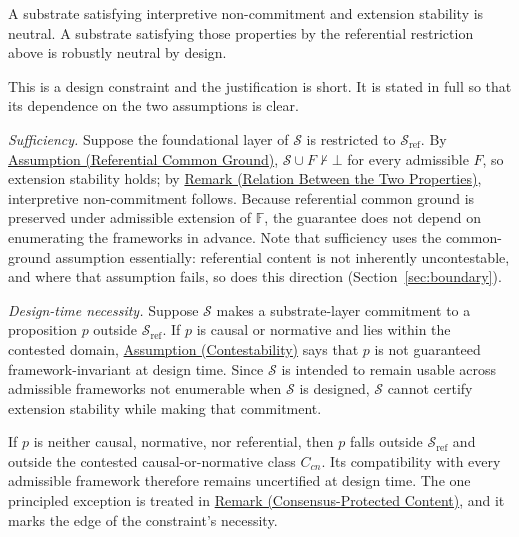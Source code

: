 \documentclass[11pt]{article}
\theoremstyle{plain}
\theoremstyle{definition}
\theoremstyle{remark}
\newcommand{\AssumpRef}[2]{\hyperref[#1]{Assumption (#2)}}
\newcommand{\RemRef}[2]{\hyperref[#1]{Remark (#2)}}
\newcommand{\SecRef}[1]{Section~\ref{#1}}
\newcommand{\Substrate}{\mathcal{S}}
\newcommand{\SubstrateRef}{\mathcal{S}_{\mathrm{ref}}}
\newcommand{\Frameworks}{\mathbb{F}}
\newcommand{\Framework}{F}
\newcommand{\notentails}{\nvdash}
\begin{document}
A substrate satisfying interpretive non-commitment and extension stability is neutral.
A substrate satisfying those properties
by the referential restriction above is robustly neutral by design.

This is a design constraint and the justification is short.
It is stated in full so that its dependence on the
two assumptions is clear.

\emph{Sufficiency.} Suppose the foundational layer of $\Substrate$ is
restricted to $\SubstrateRef$. By
\AssumpRef{se100.def.ReferentialCommonGround}{Referential Common Ground},
$\Substrate \cup \Framework \notentails \bot$ for every admissible $\Framework$,
so extension stability holds; by
\RemRef{se100.remark.PropertyRelation}{Relation Between the Two Properties},
interpretive non-commitment follows.
Because referential common ground is
preserved under admissible extension of $\Frameworks$,
the guarantee does not
depend on enumerating the frameworks in advance.
Note that sufficiency uses the
common-ground assumption essentially:
referential content is not inherently
uncontestable, and where that assumption fails,
so does this direction
(\SecRef{sec:boundary}).

\emph{Design-time necessity.} Suppose $\Substrate$ makes a
substrate-layer commitment to a proposition $p$ outside $\SubstrateRef$.
If $p$ is causal or normative and lies within the contested domain,
\AssumpRef{se100.def.Contestability}{Contestability} says that $p$ is not
guaranteed framework-invariant at design time.
Since $\Substrate$ is intended to remain usable across admissible frameworks
not enumerable when $\Substrate$ is designed,
$\Substrate$ cannot certify extension stability while making that commitment.

If $p$ is neither causal, normative, nor referential,
then $p$ falls outside $\SubstrateRef$
and outside the contested causal-or-normative class $C_{cn}$.
Its compatibility with every admissible framework
therefore remains uncertified at design time.
The one principled exception is treated in
\RemRef{se100.remark.ConsensusProtected}{Consensus-Protected Content}, and it
marks the edge of the constraint's necessity.
\end{document}
